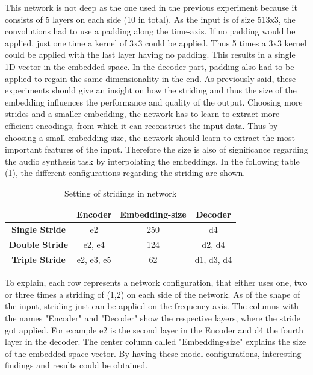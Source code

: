 This network is not deep as the one used in the previous experiment because it consists of 5 layers on each side (10 in total). As the input is of size 513x3, the convolutions had to use a padding along the time-axis. If no padding would be applied, just one time a kernel of 3x3 could be applied. Thus 5 times a 3x3 kernel could be applied with the last layer having no padding. This results in a single 1D-vector in the embedded space. In the decoder part, padding also had to be applied to regain the same dimensionality in the end. As previously said, these experiments should give an insight on how the striding and thus the size of the embedding influences the performance and quality of the output. Choosing more strides and a smaller embedding, the network has to learn to extract more efficient encodings, from which it can reconstruct the input data. Thus by choosing a small embedding size, the network should learn to extract the most important features of the input. Therefore the size is also of significance regarding the audio synthesis task by interpolating the embeddings. In the following table (\ref{tab:exp_2D_strides}), the different configurations regarding the striding are shown. 


\begin{table}[htb!]
    \centering
    \begin{tabular}{|c|c|c|c|}
        \hline
         &\textbf{Encoder}&\textbf{Embedding-size}&\textbf{Decoder} \\
         \hline
        \textbf{Single Stride} & e2 & 250 & d4 \\
        \hline
        \textbf{Double Stride} & e2, e4 & 124 & d2, d4 \\
        \hline
        \textbf{Triple Stride} & e2, e3, e5 & 62 & d1, d3, d4 \\
        \hline
    \end{tabular}
    \caption{Setting of stridings in network}
    \label{tab:exp_2D_strides}
\end{table}

To explain, each row represents a network configuration, that either uses one, two or three times a striding of (1,2) on each side of the network. As of the shape of the input, striding just can be applied on the frequency axis. The columns with the names "Encoder" and "Decoder" show the respective layers, where the stride got applied. For example e2 is the second layer in the Encoder and d4 the fourth layer in the decoder. The center column called "Embedding-size" explains the size of the embedded space vector. By having these model configurations, interesting findings and results could be obtained. 

